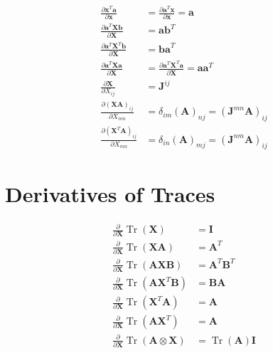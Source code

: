 $$ \begin{aligned} \frac{\partial \mathbf{x}^{T} \mathbf{a}}{\partial \mathbf{x}} &=\frac{\partial \mathbf{a}^{T} \mathbf{x}}{\partial \mathbf{x}}=\mathbf{a} \\ \frac{\partial \mathbf{a}^{T} \mathbf{X} \mathbf{b}}{\partial \mathbf{X}} &=\mathbf{a b}^{T} \\ \frac{\partial \mathbf{a}^{T} \mathbf{X}^{T} \mathbf{b}}{\partial \mathbf{X}} &=\mathbf{b a}^{T} \\ \frac{\partial \mathbf{a}^{T} \mathbf{X} \mathbf{a}}{\partial \mathbf{X}} &=\frac{\partial \mathbf{a}^{T} \mathbf{X}^{T} \mathbf{a}}{\partial \mathbf{X}}=\mathbf{a a}^{T} \\ \frac{\partial \mathbf{X}}{\partial X_{i j}} &=\mathbf{J}^{i j} \\ \frac{\partial(\mathbf{X} \mathbf{A})_{i j}}{\partial X_{m n}} &=\delta_{i m}(\mathbf{A})_{n j}=\left(\mathbf{J}^{m n} \mathbf{A}\right)_{i j} \\ \frac{\partial\left(\mathbf{X}^{T} \mathbf{A}\right)_{i j}}{\partial X_{m n}} &=\delta_{i n}(\mathbf{A})_{m j}=\left(\mathbf{J}^{n m} \mathbf{A}\right)_{i j} \end{aligned} $$

\section{Derivatives of Traces}

$$ \begin{aligned} \frac{\partial}{\partial \mathbf{X}} \operatorname{Tr}(\mathbf{X}) &=\mathbf{I} \\ \frac{\partial}{\partial \mathbf{X}} \operatorname{Tr}(\mathbf{X} \mathbf{A}) &=\mathbf{A}^{T} \\ \frac{\partial}{\partial \mathbf{X}} \operatorname{Tr}(\mathbf{A X B}) &=\mathbf{A}^{T} \mathbf{B}^{T} \\ \frac{\partial}{\partial \mathbf{X}} \operatorname{Tr}\left(\mathbf{A X}^{T} \mathbf{B}\right) &=\mathbf{B} \mathbf{A} \\ \frac{\partial}{\partial \mathbf{X}} \operatorname{Tr}\left(\mathbf{X}^{T} \mathbf{A}\right) &=\mathbf{A} \\ \frac{\partial}{\partial \mathbf{X}} \operatorname{Tr}\left(\mathbf{A X}^{T}\right) &=\mathbf{A} \\ \frac{\partial}{\partial \mathbf{X}} \operatorname{Tr}(\mathbf{A} \otimes \mathbf{X}) &=\operatorname{Tr}(\mathbf{A}) \mathbf{I} \end{aligned} $$


